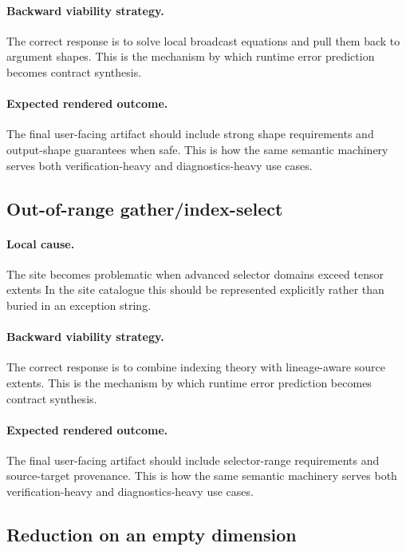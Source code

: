 \documentclass[11pt]{report}
\theoremstyle{definition}
\theoremstyle{plain}
\begin{document}
\paragraph{Backward viability strategy.}
The correct response is to solve local broadcast equations and pull them back to argument shapes. This is the mechanism by which runtime
error prediction becomes contract synthesis.

\paragraph{Expected rendered outcome.}
The final user-facing artifact should include strong shape requirements and output-shape guarantees when safe. This is how the same
semantic machinery serves both verification-heavy and diagnostics-heavy use
cases.

\subsection{Out-of-range gather/index-select}

\paragraph{Local cause.}
The site becomes problematic when advanced selector domains exceed tensor extents In the site catalogue this should be
represented explicitly rather than buried in an exception string.

\paragraph{Backward viability strategy.}
The correct response is to combine indexing theory with lineage-aware source extents. This is the mechanism by which runtime
error prediction becomes contract synthesis.

\paragraph{Expected rendered outcome.}
The final user-facing artifact should include selector-range requirements and source-target provenance. This is how the same
semantic machinery serves both verification-heavy and diagnostics-heavy use
cases.

\subsection{Reduction on an empty dimension}
\end{document}
